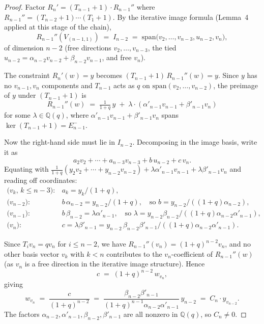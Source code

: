 \documentclass[11pt]{article}
\theoremstyle{definition}
\begin{document}
\begin{proof}
Factor $R_n' = (T_{n-1}+1) \cdot R_{n-1}''$ where
$R_{n-1}'' = (T_{n-2}+1) \cdots (T_1+1)$. By the iterative image
formula (Lemma~4 applied at this stage of the chain),
\[
  R_{n-1}''(V_{(n-1,1)}) \;=\; I_{n-2} \;=\;
    \mathrm{span}\bigl(v_2,\ldots, v_{n-3}, u_{n-2}, v_n\bigr),
\]
of dimension $n-2$ (free directions $v_2,\ldots,v_{n-3}$, the tied
$u_{n-2} = \alpha_{n-2}v_{n-2}+\beta_{n-2}v_{n-1}$, and free $v_n$).

The constraint $R_n'(w) = y$ becomes
$(T_{n-1}+1)\, R_{n-1}''(w) = y$. Since $y$ has no $v_{n-1}, v_n$
components and $T_{n-1}$ acts as $q$ on $\mathrm{span}(v_2,\ldots,v_{n-2})$,
the preimage of $y$ under $(T_{n-1}+1)$ is
\[
  R_{n-1}''(w) \;=\; \tfrac{1}{1+q}\, y \;+\; \lambda \cdot
   (\alpha'_{n-1} v_{n-1} + \beta'_{n-1} v_n)
\]
for some $\lambda \in \mathbb{Q}(q)$, where $\alpha'_{n-1}v_{n-1}+\beta'_{n-1}v_n$
spans $\ker(T_{n-1}+1) = E_{n-1}^-$.

Now the right-hand side must lie in $I_{n-2}$. Decomposing in the
image basis, write it as
\[
  a_2 v_2 + \cdots + a_{n-3} v_{n-3} + b\, u_{n-2} + c\, v_n.
\]
Equating with $\tfrac{1}{1+q}(y_2 v_2 + \cdots + y_{n-2} v_{n-2})
+ \lambda \alpha'_{n-1} v_{n-1} + \lambda \beta'_{n-1} v_n$ and reading
off coordinates:
\[
\begin{array}{ll}
\text{($v_k$, $k \le n-3$)}: & a_k = y_k/(1+q),\\
\text{($v_{n-2}$)}: & b\, \alpha_{n-2} = y_{n-2}/(1+q),\quad \text{so } b = y_{n-2}/((1+q)\alpha_{n-2}),\\
\text{($v_{n-1}$)}: & b\, \beta_{n-2} = \lambda \alpha'_{n-1},\quad \text{so } \lambda = y_{n-2}\beta_{n-2}/((1+q)\alpha_{n-2}\alpha'_{n-1}),\\
\text{($v_n$)}: & c = \lambda \beta'_{n-1} = y_{n-2}\,\beta_{n-2}\beta'_{n-1}/((1+q)\alpha_{n-2}\alpha'_{n-1}).
\end{array}
\]

Since $T_i v_n = q v_n$ for $i \le n-2$, we have
$R_{n-1}''(v_n) = (1+q)^{n-2} v_n$, and no other basis vector
$v_k$ with $k < n$ contributes to the $v_n$-coefficient of
$R_{n-1}''(w)$ (as $v_n$ is a free direction in the iterative
image structure). Hence
\[
  c \;=\; (1+q)^{n-2}\, w_{v_n},
\]
giving
\[
  w_{v_n} \;=\; \frac{c}{(1+q)^{n-2}}
              \;=\; \frac{\beta_{n-2}\beta'_{n-1}}{(1+q)^{n-1}\alpha_{n-2}\alpha'_{n-1}}\, y_{n-2}
              \;=\; C_n \cdot y_{v_{n-2}}.
\]
The factors $\alpha_{n-2}, \alpha'_{n-1}, \beta_{n-2}, \beta'_{n-1}$
are all nonzero in $\mathbb{Q}(q)$, so $C_n \neq 0$.
\end{proof}
\end{document}
